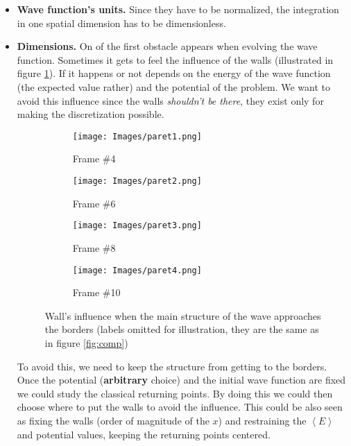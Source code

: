 \documentclass{article}
\begin{document}
\begin{itemize}
\item \textbf{Wave function's units.} Since they have to be normalized, the integration in one spatial dimension has to be dimensionless.



\item  \textbf{Dimensions.} On of the first obstacle appears when evolving the wave function. Sometimes it gets to feel the influence of the walls (illustrated in figure \ref{fig:influparet}). If it happens or not depends on the energy of the wave function (the expected value rather) and the potential of the problem. We want to avoid this influence since the walls \textit{shouldn't be there}, they exist only for making the discretization possible.\\

\begin{figure}[H]
	\centering
	\begin{subfigure}[font=tiny]{.2\textwidth}
		\centering
		\texttt{[image: Images/paret1.png]}
		\caption{Frame \#4}
	\end{subfigure}
	\begin{subfigure}[font=tiny]{.2\textwidth}
		\centering
		\texttt{[image: Images/paret2.png]}
		\caption{Frame \#6}
	\end{subfigure}
	\begin{subfigure}[font=tiny]{.2\textwidth}
		\centering
		\texttt{[image: Images/paret3.png]}
		\caption{Frame \#8}
	\end{subfigure}
	\begin{subfigure}[font=tiny]{.2\textwidth}
		\centering
		\texttt{[image: Images/paret4.png]}
		\caption{Frame \#10}
	\end{subfigure}
	\captionsetup{justification = centering, width = .8\textwidth}
	\caption{Wall's influence when the main structure of the wave approaches the borders (labels omitted for illustration, they are the same as in figure \ref{fig:comp})}
	\label{fig:influparet}
\end{figure}

To avoid this, we need to keep the structure from getting to the borders. Once the potential (\textbf{arbitrary} choice) and the initial wave function are fixed we could study the classical returning points. By doing this we could then choose where to put the walls to avoid the influence. This could be also seen as fixing the walls (order of magnitude of the $x$) and restraining the $\left\langle E \right\rangle$ and potential values, keeping the returning points centered.\\


\end{itemize}
\end{document}
